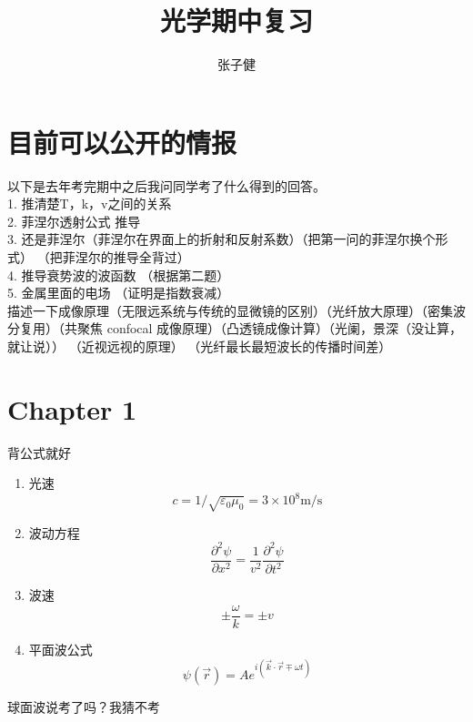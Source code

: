 \documentclass{ctexart}
\title{光学期中复习}
\author{张子健}
\begin{document}
\maketitle

\section{目前可以公开的情报}
以下是去年考完期中之后我问同学考了什么得到的回答。\\
1. 推清楚T，k，v之间的关系\\
2. 菲涅尔透射公式 推导\\
3. 还是菲涅尔（菲涅尔在界面上的折射和反射系数）（把第一问的菲涅尔换个形式） （把菲涅尔的推导全背过）\\
4. 推导衰势波的波函数 （根据第二题） \\
5. 金属里面的电场 （证明是指数衰减） \\

描述一下成像原理（无限远系统与传统的显微镜的区别）（光纤放大原理）（密集波分复用）（共聚焦 confocal 成像原理）（凸透镜成像计算）（光阑，景深（没让算，就让说）） （近视远视的原理） （光纤最长最短波长的传播时间差）\\


\section{Chapter 1} 
背公式就好\\
\begin{enumerate}

\item 光速
\begin{equation}
c=1 / \sqrt{\varepsilon_{0} \mu_{0}}=3 \times 10^{8} \mathrm{m} / \mathrm{s}
\end{equation}
\item 波动方程
\begin{equation}
\frac{\partial^{2} \psi}{\partial x^{2}}=\frac{1}{v^{2}} \frac{\partial^{2} \psi}{\partial t^{2}}
\end{equation}
\item 波速
\begin{equation}
\pm \frac{\omega}{k}=\pm v
\end{equation}
\item 平面波公式
\begin{equation}
\psi(\vec{r})=A e^{i(\vec{k} \cdot \vec{r} \mp \omega t)}
\end{equation}

\end{enumerate}
球面波说考了吗？我猜不考\\
\end{document}

